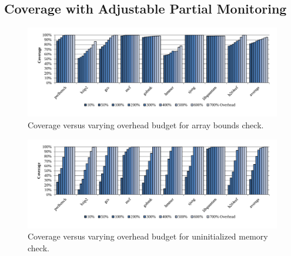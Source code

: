 \subsection{Coverage with Adjustable Partial Monitoring}

\begin{figure}
  \begin{center}
    \includegraphics[width=\linewidth]{figs/data_bc_sweep.pdf}
    \vspace{-0.4in}
    \caption{Coverage versus varying overhead budget for array bounds check.}
    \label{fig:evaluation.bc_sweep}
    \vspace{-0.2in}
  \end{center}
\end{figure}

\begin{figure}
  \begin{center}
    \includegraphics[width=\linewidth]{figs/data_umc_sweep.pdf}
    \vspace{-0.4in}
    \caption{Coverage versus varying overhead budget for uninitialized memory check.}
    \label{fig:evaluation.umc_sweep}
    \vspace{-0.1in}
  \end{center}
\end{figure}

